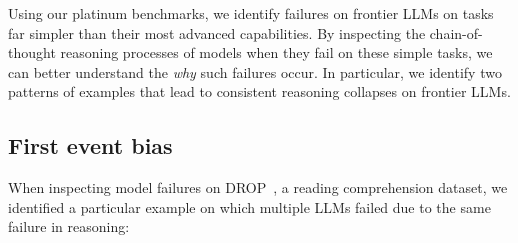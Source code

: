 Using our platinum benchmarks, we identify failures on frontier LLMs on tasks far simpler than their most advanced capabilities. By inspecting the chain-of-thought reasoning processes of models when they fail on these simple tasks, we can better understand the \textit{why} such failures occur. In particular, we identify two patterns of examples that lead to consistent reasoning collapses on frontier LLMs.

\subsection{First event bias} \label{app:patterns-event-bias}

When inspecting model failures on DROP~\cite{dua2019drop}, a reading comprehension dataset, we identified a particular example on which multiple LLMs failed due to the same failure in reasoning:

